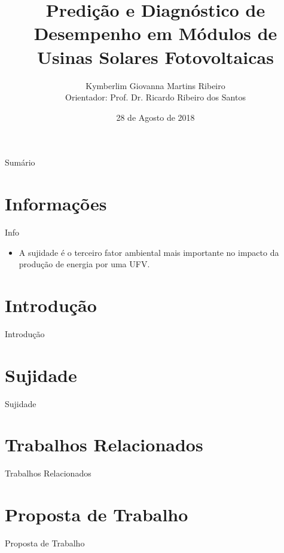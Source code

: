 \documentclass{beamer}
\title[Modelo de Apresentação]{Predição e Diagnóstico de Desempenho em Módulos de Usinas Solares Fotovoltaicas}
\author{Kymberlim Giovanna Martins Ribeiro\\ {\footnotesize Orientador: Prof. Dr. Ricardo Ribeiro dos Santos} }
\institute{FACOM - Faculdade de Computação}
\date{28 de Agosto de 2018}
\begin{document}
\begin{frame}
  \titlepage
\end{frame}


\begin{frame}{Sumário}
  \tableofcontents
\end{frame}

\section{Informações}
\begin{frame}{Info}
    \begin{itemize}
        \item A sujidade é o terceiro fator ambiental mais importante no impacto da produção de energia por uma UFV.
    \end{itemize}
\end{frame}

\section{Introdução}
\begin{frame}{Introdução}
    
\end{frame}

\section{Sujidade}
\begin{frame}{Sujidade}
    
\end{frame}

\section{Trabalhos Relacionados}
\begin{frame}{Trabalhos Relacionados}
    
\end{frame}

\section{Proposta de Trabalho}
\begin{frame}{Proposta de Trabalho}
    
\end{frame}
\end{document}
